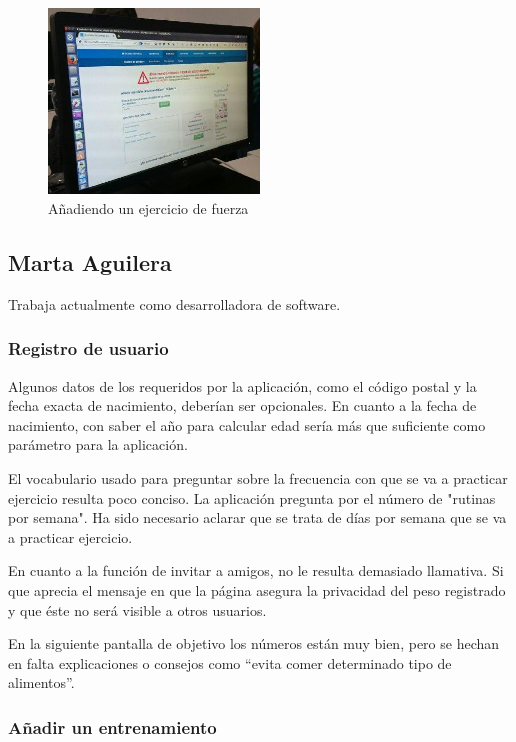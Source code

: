 \documentclass[a4paper]{article}
\begin{document}
			\begin{figure}[!h]
				\centering
				\includegraphics[width=0.5\textwidth]{./figuras/jonat-3.jpg}
				\caption{Añadiendo un ejercicio de fuerza}
			\end{figure}
		
		\FloatBarrier
		
		\subsection{Marta Aguilera}
		
		Trabaja actualmente como desarrolladora de software.
		
			\subsubsection*{Registro de usuario}
			
			Algunos datos de los requeridos por la aplicación, como el código postal y la fecha exacta de nacimiento, deberían ser opcionales. En cuanto a la fecha de nacimiento, con saber el año para calcular edad sería más que suficiente como parámetro para la aplicación.
			
			El vocabulario usado para preguntar sobre la frecuencia con que se va a practicar ejercicio resulta poco conciso. La aplicación pregunta por el número de "rutinas por semana". Ha sido necesario aclarar que se trata de días por semana que se va a practicar ejercicio.
			
			En cuanto a la función de invitar a amigos, no le resulta demasiado llamativa. Si que aprecia el mensaje en que la página asegura la privacidad del peso registrado y que éste no será visible a otros usuarios.
			
			En la siguiente pantalla de objetivo los números están muy bien, pero se hechan en falta explicaciones o consejos como ``evita comer determinado tipo de alimentos''.
			
			\subsubsection*{Añadir un entrenamiento}
			
\end{document}
